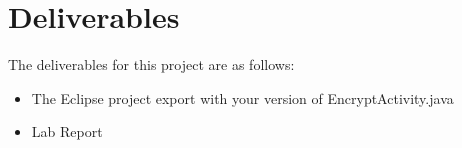 \section{Deliverables}

The deliverables for this project are as follows:

\begin{itemize}
	\item The Eclipse project export with your version of EncryptActivity.java
\end{itemize}
\begin{itemize}
	\item Lab Report
\end{itemize}

